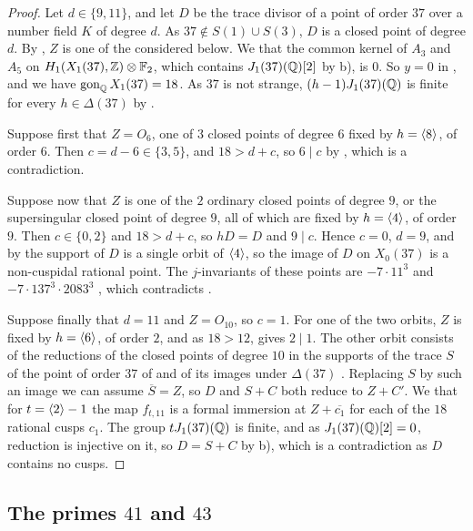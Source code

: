 \begin{proof}
Let $d\in\{9,11\}$, and let $D$ be the trace divisor of a point of order $37$ over a number field $K$ of degree $d$. As $37\notin S(1)\cup S(3)$, $D$ is a closed point of degree $d$. By , $Z$ is one of the  considered below. We  that the common kernel of $A_3$ and $A_5$ on $H_1(X_1(37),\mathbb{Z})\otimes\mathbb{F}_2$, which contains $J_1(37)(\mathbb{Q})[2]$ by  b), is $0$. So $y=0$ in , and we have $\operatorname{gon}_{\mathbb{Q}} X_1(37)=18$. As $37$ is not strange, $(h-1)J_1(37)(\mathbb{Q})$ is finite for every $h\in\Delta(37)$ by .

Suppose first that $Z=O_6$, one of $3$ closed points of degree $6$ fixed by $h=\langle 8\rangle$, of order $6$. Then $c=d-6\in\{3,5\}$, and $18>d+c$, so $6\mid c$ by , which is a contradiction.

Suppose now that $Z$ is one of the $2$ ordinary closed points of degree $9$, or the supersingular closed point of degree $9$, all of which are fixed by $h=\langle 4\rangle$, of order $9$. Then $c\in\{0,2\}$ and $18>d+c$, so $hD=D$ and $9\mid c$. Hence $c=0$, $d=9$, and by  the support of $D$ is a single orbit of $\langle 4\rangle$, so the image of $D$ on $X_0(37)$ is a non-cuspidal rational point. The $j$-invariants of these points are $-7\cdot11^3$ and $-7\cdot137^3\cdot2083^3$ \cite[Section 5]{MSD}, which contradicts .

Suppose finally that $d=11$ and $Z=O_{10}$, so $c=1$. For one of the two orbits, $Z$ is fixed by $h=\langle 6\rangle$, of order $2$, and as $18>12$,  gives $2\mid 1$. The other orbit consists of the reductions of the closed points of degree $10$ in the supports of the trace $S$ of the point of order $37$ of  and of its images under $\Delta(37)$ . Replacing $S$ by such an image we can assume $\overline S=Z$, so $D$ and $S+C$ both reduce to $Z+C'$. We  that for $t=\langle 2\rangle-1$ the map $f_{t,11}$ is a formal immersion at $Z+\overline{c_1}$ for each of the $18$ rational cusps $c_1$. The group $tJ_1(37)(\mathbb{Q})$ is finite, and as $J_1(37)(\mathbb{Q})[2]=0$, reduction is injective on it, so $D=S+C$ by  b), which is a contradiction as $D$ contains no cusps.
\end{proof}

\subsection{The primes \texorpdfstring{$41$}{41} and \texorpdfstring{$43$}{43}}

